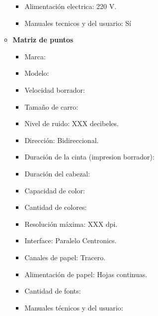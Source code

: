 \begin{enumerate}
\begin{itemize}
\begin{itemize}
      \item Alimentación electrica: 220 V.
      \item Manuales tecnicos y del usuario: Sí
    \end{itemize}
    
    \item \textbf{Matriz de puntos}
    \begin{itemize}
      \item Marca:
      \item Modelo:
      \item Velocidad borrador:
      \item Tamaño de carro:
      \item Nivel de ruido: XXX decibeles.
      \item Dirección: Bidireccional.
      \item Duración de la cinta (impresion borrador):
      \item Duración del cabezal:
      
      \item Capacidad de color:
      \item Cantidad de colores:
      \item Resolución máxima: XXX dpi.
      
      \item Interface: Paralelo Centronics.
      
      \item Canales de papel: Tracero.
      \item Alimentación de papel: Hojas continuas.
      
      \item Cantidad de fonts:
      
      \item Manuales técnicos y del usuario:
    \end{itemize}
    
  \end{itemize}
\end{enumerate} 

